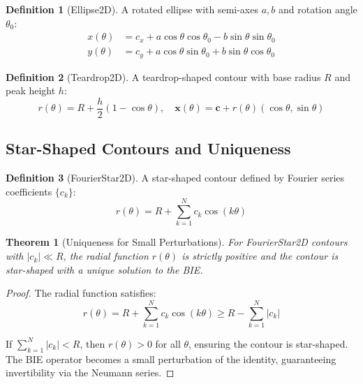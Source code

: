 \documentclass[12pt]{article}
\newtheorem{theorem}{Theorem}
\theoremstyle{definition}
\newtheorem{definition}{Definition}
\begin{document}
\begin{definition}[Ellipse2D]
A rotated ellipse with semi-axes $a, b$ and rotation angle $\theta_0$:
\begin{align}
x(\theta) &= c_x + a \cos \theta \cos \theta_0 - b \sin \theta \sin \theta_0 \\
y(\theta) &= c_y + a \cos \theta \sin \theta_0 + b \sin \theta \cos \theta_0
\end{align}
\end{definition}

\begin{definition}[Teardrop2D]
A teardrop-shaped contour with base radius $R$ and peak height $h$:
\begin{equation}
r(\theta) = R + \frac{h}{2} (1 - \cos \theta), \quad \mathbf{x}(\theta) = \mathbf{c} + r(\theta) (\cos \theta, \sin \theta)
\end{equation}
\end{definition}

\subsection{Star-Shaped Contours and Uniqueness}

\begin{definition}[FourierStar2D]
A star-shaped contour defined by Fourier series coefficients $\{c_k\}$:
\begin{equation}
r(\theta) = R + \sum_{k=1}^N c_k \cos(k \theta)
\end{equation}
\end{definition}

\begin{theorem}[Uniqueness for Small Perturbations]
For FourierStar2D contours with $|c_k| \ll R$, the radial function $r(\theta)$ is strictly positive and the contour is star-shaped with a unique solution to the BIE.
\end{theorem}

\begin{proof}
The radial function satisfies:
\begin{equation}
r(\theta) = R + \sum_{k=1}^N c_k \cos(k \theta) \ge R - \sum_{k=1}^N |c_k|
\end{equation}

If $\sum_{k=1}^N |c_k| < R$, then $r(\theta) > 0$ for all $\theta$, ensuring the contour is star-shaped. The BIE operator becomes a small perturbation of the identity, guaranteeing invertibility via the Neumann series.
\end{proof}
\end{document}

